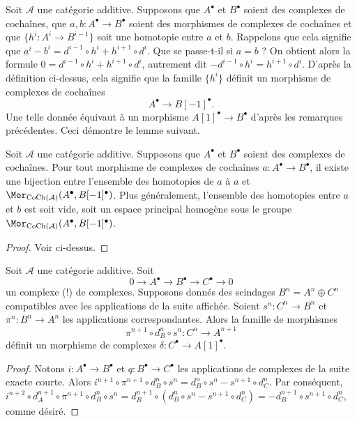 \medskip\noindent
Soit $\mathcal{A}$ une catégorie additive.
Supposons que $A^\bullet$ et $B^\bullet$ soient des
complexes de cochaînes, que $a, b : A^\bullet \to B^\bullet$ soient des
morphismes de complexes de cochaînes et que $\{h^i : A^i \to B^{i - 1}\}$
soit une homotopie entre $a$ et $b$. Rappelons que cela signifie
que
$a^i - b^i = d^{i - 1} \circ h^i + h^{i + 1} \circ d^i$.
Que se passe-t-il si $a = b$ ? On obtient alors la formule
$0 = d^{i - 1} \circ h^i + h^{i + 1} \circ d^i$,
autrement dit $ - d^{i - 1} \circ h^i = h^{i + 1} \circ d^i$.
D'après la définition ci-dessus, cela signifie que la famille $\{h^i\}$
définit un morphisme de complexes de cochaînes
$$
A^\bullet \longrightarrow B[-1]^\bullet.
$$
Une telle donnée équivaut à un morphisme $A[1]^\bullet \to B^\bullet$
d'après les remarques précédentes. Ceci démontre le lemme suivant.

\begin{lemma}
\label{lemma-homotopy-shift-cochain}
Soit $\mathcal{A}$ une catégorie additive.
Supposons que $A^\bullet$ et $B^\bullet$ soient des
complexes de cochaînes. Pour tout morphisme de complexes de cochaînes
$a : A^\bullet \to B^\bullet$, il existe
une bijection entre l'ensemble des homotopies
de $a$ à $a$ et
$\Mor_{\text{CoCh}(\mathcal{A})}(A^\bullet, B[-1]^\bullet)$.
Plus généralement, l'ensemble des homotopies entre
$a$ et $b$ est soit vide, soit un espace principal homogène
sous le groupe
$\Mor_{\text{CoCh}(\mathcal{A})}(A^\bullet, B[-1]^\bullet)$.
\end{lemma}

\begin{proof}
Voir ci-dessus.
\end{proof}

\begin{lemma}
\label{lemma-ses-termwise-split-cochain}
Soit $\mathcal{A}$ une catégorie additive.
Soit
$$
0 \to A^\bullet \to B^\bullet \to C^\bullet \to 0
$$
un complexe (!) de complexes.
Supposons donnés des scindages $B^n = A^n \oplus C^n$
compatibles avec les applications de la suite affichée.
Soient $s^n : C^n \to B^n$ et $\pi^n : B^n \to A^n$ les
applications correspondantes. Alors la famille de morphismes
$$
\pi^{n + 1} \circ d_B^n \circ s^n
:
C^n \to A^{n + 1}
$$
définit un morphisme de complexes $\delta : C^\bullet \to A[1]^\bullet$.
\end{lemma}

\begin{proof}
Notons $i : A^\bullet \to B^\bullet$ et $q : B^\bullet \to C^\bullet$
les applications de complexes de la suite exacte courte. Alors
$i^{n + 1} \circ \pi^{n + 1} \circ d_B^n \circ s^n =
d_B^n \circ s^n - s^{n + 1} \circ d_C^n$. Par conséquent,
$i^{n + 2} \circ d_A^{n + 1} \circ \pi^{n + 1} \circ d_B^n \circ s^n =
d_B^{n + 1} \circ (d_B^n \circ s^n - s^{n + 1} \circ d_C^n) =
- d_B^{n + 1} \circ s^{n + 1} \circ d_C^n$, comme désiré.
\end{proof}

